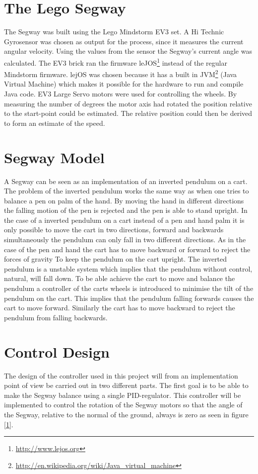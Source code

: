  \section{The Lego Segway}
 The Segway was built using the Lego Mindstorm EV3 set. A Hi Technic Gyrosensor was chosen as output for the process, since it measures the current angular velocity. Using the values from the sensor the Segway's current angle was calculated. The EV3 brick ran the firmware leJOS\footnote{\url{http://www.lejos.org}} instead of the regular Mindstorm firmware. lejOS was chosen because it has a built in JVM\footnote{\url{http://en.wikipedia.org/wiki/Java_virtual_machine}} (Java Virtual Machine) which makes it possible for the hardware to run and compile Java code. EV3 Large Servo motors were used for controlling the wheels. By measuring the number of degrees the motor axis had rotated the position relative to the start-point could be estimated. The relative position could then be derived to form an estimate of the speed. 

\section{Segway Model}
A Segway can be seen as an implementation of an inverted pendulum on a cart. The problem of the inverted pendulum works the same way as when one tries to balance a pen on palm of the hand. By moving the hand in different directions the falling motion of the pen is rejected and the pen is able to stand upright. In the case of a inverted pendulum on a cart instead of a pen and hand palm it is only possible to move the cart in two directions, forward and backwards simultaneously the pendulum can only fall in two different directions. As in the case of the pen and hand the cart has to move backward or forward to reject the forces of gravity To keep the pendulum on the cart upright. The inverted pendulum is a unstable system which implies that the pendulum without control, natural, will fall down. To be able achieve the cart to move and balance the pendulum a controller of the carts wheels is introduced to minimise the tilt of the pendulum on the cart. This implies that the pendulum falling forwards causes the cart to move forward. Similarly the cart has to move backward to reject the pendulum from falling backwards. 


\section{Control Design}
The design of the controller used in this project will from an implementation point of view  be carried out in two different parts. 
The first goal is to be able to make the Segway balance using a single PID-regulator. This controller will be implemented to control the rotation of the Segway motors so that the angle of the Segway, relative to the normal of the ground, always is zero as seen in figure \ref{1}.

